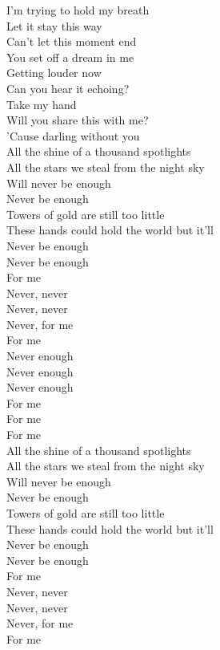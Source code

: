 
I'm trying to hold my breath \tab{}\\
Let it stay this way \tab{} \\
Can't let this moment end \tab{}\\
You set off a dream in me \tab{}\\
Getting louder now \tab{}\\
Can you hear it echoing? \tab{}\\
\hops
Take my hand \tab{}\tab{} \\
Will you share this with me? \tab{}\\
'Cause darling without you \tab{}\\
\hops
All the shine of a thousand spotlights \\
All the stars we steal from the night sky \\
Will never be enough \tab{}\\
Never be enough \tab{}\\
Towers of gold are still too little \\
These hands could hold the world but it'll \\
Never be enough \tab{}\\
Never be enough \tab{}\\
\hops
For me \tab{}\\
Never, never\\
Never, never \tab{}\\
Never, for me \tab{}\\
For me\\
Never enough \tab{}\\
Never enough \tab{}\\
Never enough \tab{}\\
For me \tab{}\\
For me\\
For me\\
\hops
All the shine of a thousand spotlights \\
All the stars we steal from the night sky \\
Will never be enough \tab{}\\
Never be enough \tab{}\\
Towers of gold are still too little \\
These hands could hold the world but it'll \\
Never be enough \tab{}\\
Never be enough \tab{}\\
\hops
For me \tab{}\\
Never, never\\
Never, never \tab{}\\
Never, for me \tab{}\\
For me\\

